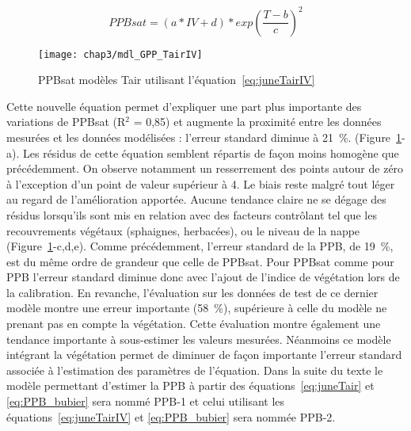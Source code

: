 \begin{equation}\label{eq:juneTairIV}
PPBsat = (a * IV + d) * exp(\frac{T - b}{c})^2
\end{equation}

\begin{figure}
\centering
\texttt{[image: chap3/mdl\_GPP\_TairIV]}
\caption{PPBsat modèles Tair utilisant l'équation~\ref{eq:juneTairIV}}
\label{fig:mdl_GPP_TairIV}
\end{figure}

Cette nouvelle équation permet d'expliquer une part plus importante des variations de PPBsat (R$^{2}$ = 0,85) et augmente la proximité entre les données mesurées et les données modélisées : l'erreur standard diminue à \SI{21}{\percent}. (Figure~\ref{fig:mdl_GPP_TairIV}-a).
Les résidus de cette équation semblent répartis de façon moins homogène que précédemment.
On observe notamment un resserrement des points autour de zéro à l'exception d'un point de valeur supérieur à \num{4}.
Le biais reste malgré tout léger au regard de l'amélioration apportée.
Aucune tendance claire ne se dégage des résidus lorsqu'ils sont mis en relation avec des facteurs contrôlant tel que les recouvrements végétaux (sphaignes, herbacées), ou le niveau de la nappe (Figure~\ref{fig:mdl_GPP_TairIV}-c,d,e).
Comme précédemment, l'erreur standard de la PPB, de \SI{19}{\percent}, est du même ordre de grandeur que celle de PPBsat.
Pour PPBsat comme pour PPB l'erreur standard diminue donc avec l'ajout de l'indice de végétation lors de la calibration.
En revanche, l'évaluation sur les données de test de ce dernier modèle montre une erreur importante (\SI{58}{\percent}), supérieure à celle du modèle ne prenant pas en compte la végétation.
Cette évaluation montre également une tendance importante à sous-estimer les valeurs mesurées.
Néanmoins ce modèle intégrant la végétation permet de diminuer de façon importante l'erreur standard associée à l'estimation des paramètres de l'équation.
Dans la suite du texte le modèle permettant d'estimer la PPB à partir des équations~\ref{eq:juneTair} et \ref{eq:PPB_bubier} sera nommé PPB-1 et celui utilisant les équations~\ref{eq:juneTairIV} et \ref{eq:PPB_bubier} sera nommée PPB-2.




